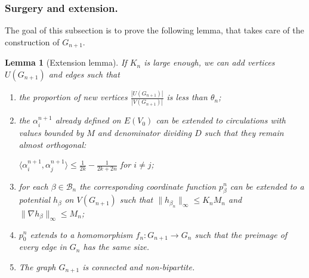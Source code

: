 \documentclass[10pt]{article}
\theoremstyle{plain}
\newtheorem{lemma}{Lemma}[section]
\theoremstyle{remark}
\newcommand{\1}{\mathbbm{1}}
\numberwithin{equation}{section}
\begin{document}
\subsubsection{Surgery and extension.} \label{subsubsec:surgery_and_extension}

The goal of this subsection is to prove the following lemma, that takes care of the construction of $G_{n+1}$.

\begin{lemma}[Extension lemma] \label{lemma:extension}
    If $K_n$ is large enough, we can add vertices $U(G_{n+1})$ and edges such that \begin{enumerate}
        \item \label{itm:proportion} the proportion of new vertices $\frac{|U(G_{n+1})|}{|V(G_{n+1})|}$ is less than $\theta_n$;
        
        \item \label{itm:circ} the $\alpha^{n+1}_i$ already defined on $E(V_0)$ can be extended to circulations with values bounded by $M$ and denominator dividing $D$ such that they remain almost orthogonal: 
        
        $\langle \alpha_i^{n+1}, \alpha_j^{n+1} \rangle \leq \frac{1}{2k}-\frac{1}{2k+2n}$ for $i \neq j$; 
        
        \item \label{itm:bounded_potential_gradient} for each $\beta \in \mathcal{B}_n$ the corresponding coordinate function $p^n_{\beta}$ can be extended to a potential $h_{\beta}$ on $V(G_{n+1})$ such that $\|h_{\beta_{n}}\|_{\infty}\leq K_n M_n$ and $\| \nabla h_{\beta} \|_{\infty} \leq M_n$;
        
        \item{$p_0^n$} \label{itm:proper} extends to a homomorphism $f_n: G_{n+1} \to G_n$ such that the preimage of every edge in $G_n$ has the same size.

        \item The graph $G_{n+1}$ is connected and non-bipartite.
    \end{enumerate}
\end{lemma}
\end{document}
